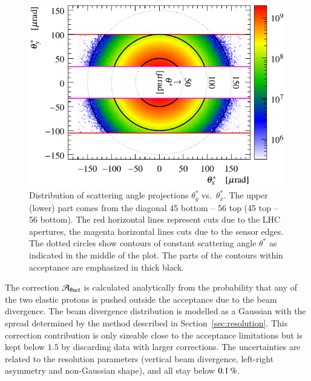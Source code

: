 \begin{figure}
\begin{center}
\includegraphics{fig/acc_corr_phi_lab.pdf}
\vskip-3mm
\caption{%
Distribution of scattering angle projections $\theta_y^*$ vs.~$\theta_x^*$. The upper (lower) part comes from the diagonal 45 bottom -- 56 top (45 top -- 56 bottom). The red horizontal lines represent cuts due to the LHC apertures, the magenta horizontal lines cuts due to the sensor edges. The dotted circles show contours of constant scattering angle $\theta^*$ as indicated in the middle of the plot. The parts of the contours within acceptance are emphasized in thick black.
}
\label{fig:acceptance principle}
\end{center}
\end{figure}


The correction ${\cal A}_{\rm fluct}$ is calculated analytically from the probability that any of the two elastic protons is pushed outside the acceptance due to the beam divergence. The beam divergence distribution is modelled as a Gaussian with the spread determined by the method described in Section~\ref{sec:resolution}. This correction contribution is only sizeable close to the acceptance limitations but is kept below $1.5$ by discarding data with larger corrections. The uncertainties are related to the resolution parameters (vertical beam divergence, left-right asymmetry and non-Gaussian shape), and all stay below $0.1\,{\rm \%}$.

